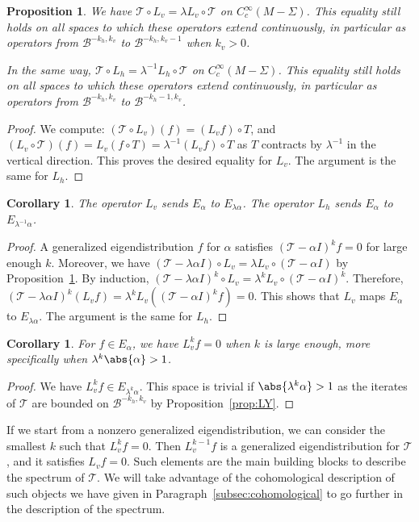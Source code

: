 \documentclass[11pt, a4paper, oneside, final, pagebackref]{amsart}
\newcommand{\boB}{\mathcal{B}}
\newcommand{\boT}{\mathcal{T}}
\newtheorem{prop}[thm]{Proposition}
\newtheorem{cor}[thm]{Corollary}
\theoremstyle{definition}
\numberwithin{equation}{section}
\begin{document}
\begin{prop}
\label{prop:action_Lv} We have $\boT \circ L_v = \lambda L_v \circ \boT$ on
$C^\infty_c(M-\Sigma)$. This equality still holds on all spaces to which
these operators extend continuously, in particular as operators from
$\boB^{-k_h, k_v}$ to $\boB^{-k_h, k_v-1}$ when $k_v>0$.

In the same way, $\boT \circ L_h = \lambda^{-1} L_h \circ \boT$ on
$C^\infty_c(M-\Sigma)$. This equality still holds on all spaces to which
these operators extend continuously, in particular as operators from
$\boB^{-k_h, k_v}$ to $\boB^{-k_h-1, k_v}$.
\end{prop}
\begin{proof}
We compute: $(\boT \circ L_v)(f) = (L_v f) \circ T$, and $(L_v \circ \boT)(f)
= L_v (f \circ T) = \lambda^{-1} (L_v f)\circ T$ as $T$ contracts by
$\lambda^{-1}$ in the vertical direction. This proves the desired equality
for $L_v$. The argument is the same for $L_h$.
\end{proof}


\begin{cor}
\label{cor:Lu_Ls_Erho} The operator $L_v$ sends $E_\alpha$ to
$E_{\lambda\alpha}$. The operator $L_h$ sends $E_\alpha$ to
$E_{\lambda^{-1}\alpha}$.
\end{cor}
\begin{proof}
A generalized eigendistribution $f$ for $\alpha$ satisfies $(\boT-\alpha I)^k
f= 0$ for large enough $k$. Moreover, we have $(\boT -\lambda \alpha I) \circ
L_v = \lambda L_v \circ (\boT - \alpha I)$ by
Proposition~\ref{prop:action_Lv}. By induction, $(\boT -\lambda \alpha I)^k
\circ L_v = \lambda^k L_v \circ (\boT-\alpha I)^k$. Therefore, $(\boT
-\lambda \alpha I)^k (L_v f) = \lambda^k L_v ( (\boT-\alpha I)^k f) = 0$.
This shows that $L_v$ maps $E_\alpha$ to $E_{\lambda \alpha}$. The argument
is the same for $L_h$.
\end{proof}


\begin{cor}
\label{cor:iter_Lv_0} For $f \in E_\alpha$, we have $L_v^k f = 0$ when $k$ is
large enough, more specifically when $\lambda^k \abs{\alpha}>1$.
\end{cor}
\begin{proof}
We have $L_v^k f \in E_{\lambda^k \alpha}$. This space is trivial if
$\abs{\lambda^k \alpha}>1$ as the iterates of $\boT$ are bounded on
$\boB^{-k_h, k_v}$ by Proposition~\ref{prop:LY}.
\end{proof}

If we start from a nonzero generalized eigendistribution, we can consider the
smallest $k$ such that $L_v^k f = 0$. Then $L_v^{k-1} f$ is a generalized
eigendistribution for $\boT$, and it satisfies $L_v f = 0$. Such elements are
the main building blocks to describe the spectrum of $\boT$. We will take
advantage of the cohomological description of such objects we have given in
Paragraph~\ref{subsec:cohomological} to go further in the description of the
spectrum.
\end{document}
